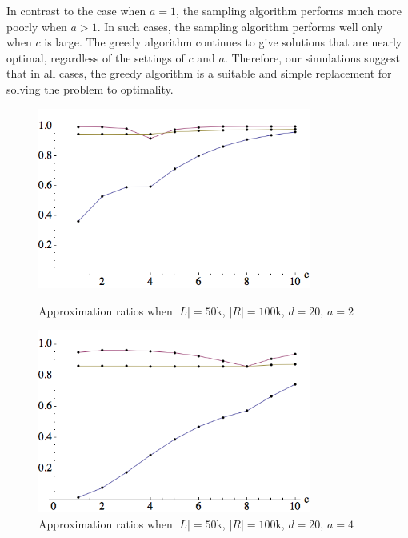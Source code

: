 In contrast to the case when $a=1$, the sampling algorithm performs much more
poorly when $a>1$. In such cases, the sampling algorithm performs well only when
$c$ is large. The greedy algorithm continues to give solutions that are nearly
optimal, regardless of the settings of $c$ and $a$. Therefore, our simulations
suggest that in all cases, the greedy algorithm is a suitable and simple
replacement for solving the problem to optimality.

\begin{figure}[h]
\centering
\begin{minipage}[h]{0.45\textwidth}
\centering
\includegraphics[width=0.8\textwidth]{images/l=50000,r=100000,a=2_Greedy_vs_Naive.png}
\caption{Approximation ratios when $|L|=50$k, $|R|=100$k, $d=20$, $a=2$}
\end{minipage}
\hspace{0.2cm}
\begin{minipage}[h]{0.45\textwidth}
\centering
\includegraphics[width=0.8\textwidth]{images/l=50000,r=100000,a=4_Greedy_vs_Naive.png}
\caption{Approximation ratios when $|L|=50$k, $|R|=100$k, $d=20$, $a=4$}
\end{minipage}
\end{figure}